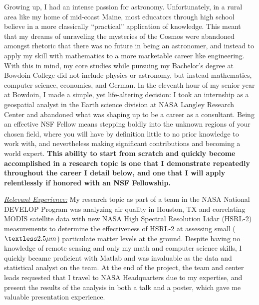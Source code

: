 Growing up, I had an  intense passion for astronomy. Unfortunately, in
a rural area  like my home of mid-coast Maine,  most educators through
high school believe  in a more classically  “practical” application of
knowledge. This  meant that my  dreams of unraveling the  mysteries of
the Cosmos were abandoned amongst rhetoric that there was no future in
being an astronomer, and instead to apply my skill with mathematics to
a more marketable career like engineering.  With this in mind, my core
studies while pursuing my Bachelor’s degree at Bowdoin College did not
include  physics  or  astronomy,  but  instead  mathematics,  computer
science, economics, and German. In the eleventh hour of my senior year
at Bowdoin,  I made a  simple, yet  life-altering decision: I  took an
internship as  a geospatial analyst  in the Earth science  division at
NASA Langley Research Center and abandoned what was shaping up to be a
career as a consultant.  Being  an effective NSF Fellow means stepping
boldly into the  unknown regions of your chosen field,  where you will
have by  definition little  to no  prior knowledge  to work  with, and
nevertheless  making significant  contributions and  becoming a  world
expert.   \textbf{This  ability  to  start from  scratch  and  quickly  become
accomplished in a research topic  is one that I demonstrate repeatedly
throughout  the career  I  detail below,  and one  that  I will  apply
relentlessly if honored with an NSF Fellowship.}


\underline{\textit{Relevant Experience:}}
My  research topic  as part  of a  team in  the NASA  National DEVELOP
Program was analyzing air quality in Houston, TX and correlating MODIS
satellite data with  new NASA High Spectral  Resolution Lidar (HSRL-2)
measurements  to determine  the effectiveness  of HSRL-2  at assessing
small  ($\textless2.5\mu   m$)  particulate   matter  levels   at  the
ground. Despite having no knowledge of remote sensing and only my math
and computer science  skills, I quickly became  proficient with Matlab
and was  invaluable as the data  and statistical analyst on  the team.
At the end of the project, the  team and center leads requested that I
travel  to NASA  Headquarters due  to  my expertise,  and present  the
results of  the analysis in  both a talk and  a poster, which  gave me
valuable presentation experience.

